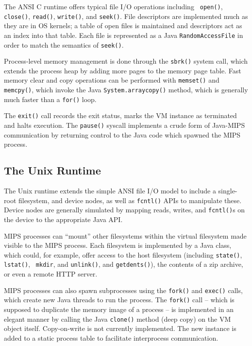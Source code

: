 \documentclass{acmconf}
\begin{document}
The ANSI C runtime offers typical file I/O operations including {\tt
open()}, {\tt close()}, {\tt read()}, {\tt write()}, and {\tt seek()}.
File descriptors are implemented much as they are in OS kernels; a
table of open files is maintained and descriptors act as an index into
that table.  Each file is represented as a Java {\tt RandomAccessFile}
in order to match the semantics of {\tt seek()}.

Process-level memory management is done through the {\tt sbrk()}
system call, which extends the process heap by adding more pages to
the memory page table.  Fast memory clear and copy operations can be
performed with {\tt memset()} and {\tt memcpy()}, which invoke the
Java {\tt System.arraycopy()} method, which is generally much faster
than a {\tt for()} loop.

The {\tt exit()} call records the exit status, marks the VM instance
as terminated and halts execution.  The {\tt pause()} syscall
implements a crude form of Java-MIPS communication by returning
control to the Java code which spawned the MIPS process.

\subsection{The Unix Runtime}

The Unix runtime extends the simple ANSI file I/O model to include a
single-root filesystem, and device nodes, as well as {\tt fcntl()}
APIs to manipulate these.  Device nodes are generally simulated by
mapping reads, writes, and {\tt fcntl()}s on the device to the
appropriate Java API.

MIPS processes can ``mount'' other filesystems within the virtual
filesystem made visible to the MIPS process.  Each filesystem is
implemented by a Java class, which could, for example, offer access to
the host filesystem (including {\tt state()}, {\tt lstat()}, {\tt
mkdir}, and {\tt unlink()}, and {\tt getdents()}), the contents of a
zip archive, or even a remote HTTP server.

MIPS processes can also spawn subprocesses using the {\tt fork()} and
{\tt exec()} calls, which create new Java threads to run the process.
The {\tt fork()} call -- which is supposed to duplicate the memory
image of a process -- is implemented in an elegant manner by calling
the Java {\tt clone()} method (deep copy) on the VM object itself.
Copy-on-write is not currently implemented.  The new instance is added
to a static process table to facilitate interprocess communication.
\end{document}
